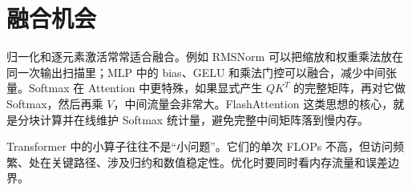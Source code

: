 \section{融合机会}

归一化和逐元素激活常常适合融合。例如 RMSNorm 可以把缩放和权重乘法放在同一次输出扫描里；MLP 中的 bias、GELU 和乘法门控可以融合，减少中间张量。Softmax 在 Attention 中更特殊，如果显式产生 $QK^T$ 的完整矩阵，再对它做 Softmax，然后再乘 $V$，中间流量会非常大。FlashAttention 这类思想的核心，就是分块计算并在线维护 Softmax 统计量，避免完整中间矩阵落到慢内存。

\begin{keyidea}
Transformer 中的小算子往往不是“小问题”。它们的单次 FLOPs 不高，但访问频繁、处在关键路径、涉及归约和数值稳定性。优化时要同时看内存流量和误差边界。
\end{keyidea}
